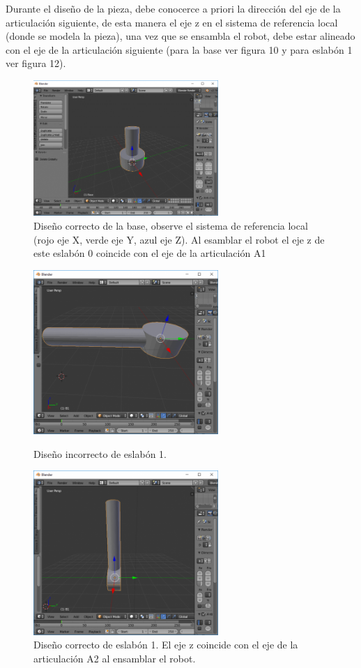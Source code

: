 \documentclass[12pt,a4paper]{report}
\begin{document}
Durante el diseño de la pieza, debe conocerce a priori la dirección del eje de la articulación siguiente, de esta manera el eje z en el sistema de referencia local (donde se modela la pieza), una vez que se ensambla el robot,  debe estar alineado con el eje de la articulación siguiente (para la base ver figura 10 y para eslabón 1 ver figura 12).
\begin{figure}[hbtp]
\centering
\includegraphics[width=7cm]{10.png}
\caption{Diseño correcto de la base, observe el sistema de referencia local (rojo eje X, verde eje Y, azul eje Z). Al esamblar el robot el eje z de este eslabón 0  coincide con el eje de la articulación A1}
\end{figure}
\begin{figure}[hbtp]
\centering
\includegraphics[width=7cm]{11.png}
\caption{Diseño incorrecto de eslabón 1.}
\includegraphics[width=7cm]{12.png}
\caption{Diseño correcto de eslabón 1. El eje z coincide con el eje de la articulación A2 al ensamblar el robot.}
\end{figure}
\end{document}
